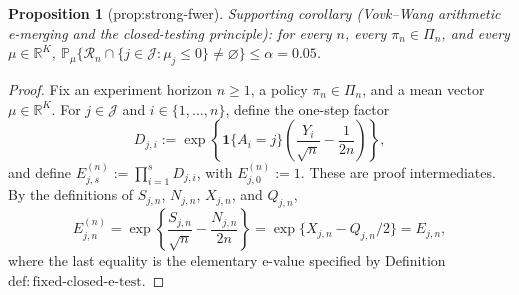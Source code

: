 \documentclass{article}
\newtheorem{proposition}{Proposition}
\begin{document}
\begin{proposition}[prop:strong-fwer]\label{prop:strong-fwer}
Supporting corollary (Vovk--Wang arithmetic e-merging and the closed-testing principle): for every \(n\), every \(\pi_n\in\Pi_n\), and every \(\mu\in\mathbb R^K\), \(\mathbb P_\mu\{\mathcal R_n\cap\{j\in\mathcal J:\mu_j\leq0\}\neq\varnothing\}\leq\alpha=0.05\).
\end{proposition}
\begin{proof}
Fix an experiment horizon \(n\geq 1\), a policy \(\pi_n\in\Pi_n\), and a mean vector \(\mu\in\mathbb R^K\).  For \(j\in\mathcal J\) and \(i\in\{1,\ldots,n\}\), define the one-step factor
\[
D_{j,i}:=\exp\!\left\{\mathbf 1\{A_i=j\}\left(\frac{Y_i}{\sqrt n}-\frac{1}{2n}\right)\right\},
\]
and define \(E^{(n)}_{j,s}:=\prod_{i=1}^sD_{j,i}\), with \(E^{(n)}_{j,0}:=1\).  These are proof intermediates.  By the definitions of \(S_{j,n}\), \(N_{j,n}\), \(X_{j,n}\), and \(Q_{j,n}\),
\[
E^{(n)}_{j,n}
=\exp\!\left\{\frac{S_{j,n}}{\sqrt n}-\frac{N_{j,n}}{2n}\right\}
=\exp\{X_{j,n}-Q_{j,n}/2\}
=E_{j,n},
\]
where the last equality is the elementary e-value specified by Definition \(\mathrm{def:fixed\text{-}closed\text{-}e\text{-}test}\).


\end{proof}
\end{document}
